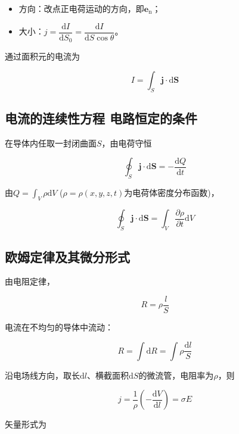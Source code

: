 \documentclass[
	12pt, %
	a4paper, %
]{myLegrandOrangeBook}
\newcommand{\rmd}{\mathrm{d}}
\newcommand{\deriv}[2]{\frac{\rmd #1}{\rmd #2}}
\newcommand{\pderiv}[2]{\frac{\partial #1}{\partial #2}}
\newcommand{\dderiv}[2]{\dfrac{\rmd #1}{\rmd #2}}
\begin{document}
\begin{itemize}
    \item 方向：改点正电荷运动的方向，即$\mathbf{e}_{\text{n}}$；
    \item 大小：$j = \dderiv{I}{S_0} = \dderiv{I}{S \cos \theta}$。
\end{itemize}

通过面积元的电流为

\begin{equation}
    I = \int_S \mathbf{j} \cdot \rmd \mathbf{S}
\end{equation}

\subsection{电流的连续性方程 \quad 电路恒定的条件}

在导体内任取一封闭曲面$S$，由电荷守恒

\begin{equation}
    \oint_S \mathbf{j} \cdot \rmd \mathbf{S} = - \deriv{Q}{t}
\end{equation}

由$Q = \int_V \rho \rmd V$ ($\rho = \rho(x,y,z,t)$为电荷体密度分布函数)，

\begin{equation}
    \oint_S \mathbf{j} \cdot \rmd \mathbf{S} = \int_V \pderiv{\rho}{t} \rmd V
\end{equation}

\subsection{欧姆定律及其微分形式}

由电阻定律，

\begin{equation}
    R = \rho \frac{l}{S}
\end{equation}

电流在不均匀的导体中流动：

\begin{equation}
    R = \int \rmd R = \int \rho \frac{\rmd l}{S}
\end{equation}

沿电场线方向，取长$\rmd l$、横截面积$\rmd S$的微流管，电阻率为$\rho$，则

\begin{equation}
    j = \frac{1}{\rho}\left(-\deriv{V}{l}\right) = \sigma E
\end{equation}

矢量形式为
\end{document}
